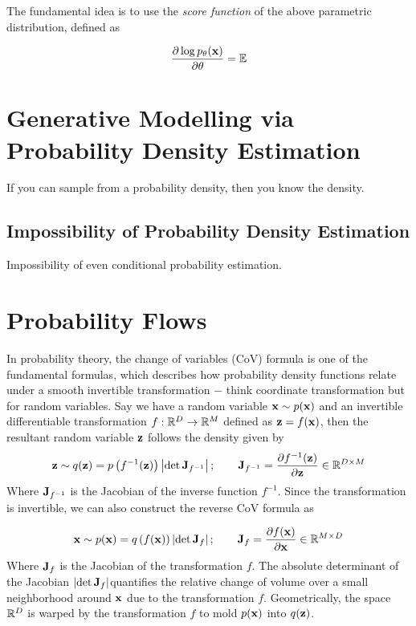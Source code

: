 \documentclass[a4paper, 11pt]{article}
\begin{document}
The fundamental idea is to use the \emph{score function} of the above parametric distribution, defined as 

\begin{align}
    \frac{\partial \log p_\theta(\mbox{$\mbox{$\mathbf{x}$}$})}{\partial \theta} = \mathbb{E} 
\end{align}


\section{Generative Modelling via Probability Density Estimation}

If you can sample from a probability density, then you know the density.

\subsection{Impossibility of Probability Density Estimation}
Impossibility of even conditional probability estimation.

\section{Probability Flows}
In probability theory, the change of variables (CoV) formula is one of the fundamental formulas, which describes how probability density functions relate under a smooth invertible transformation $-$ think coordinate transformation but for random variables. Say we have a random variable $\mbox{$\mbox{$\mathbf{x}$}$} \sim p(\mbox{$\mbox{$\mathbf{x}$}$})$ and an invertible differentiable transformation $f: \mathbb{R}^D \to \mathbb{R}^M$ defined as $\mbox{$\mbox{$\mathbf{z}$}$} = f(\mbox{$\mbox{$\mathbf{x}$}$})$, then the resultant random variable $\mbox{$\mbox{$\mathbf{z}$}$}$ follows the density given by
\begin{align}
    \mbox{$\mbox{$\mathbf{z}$}$} \sim q(\mbox{$\mbox{$\mathbf{z}$}$}) = p\left(f^{-1}(\mbox{$\mbox{$\mathbf{z}$}$}) \right)\left |\det \mbox{$\mbox{$\mathbf{J}$}$}_{f^{-1}} \right|; \qquad \mbox{$\mbox{$\mathbf{J}$}$}_{f^{-1}} = \frac{\partial f^{-1}(\mbox{$\mbox{$\mathbf{z}$}$})}{\partial \mbox{$\mbox{$\mathbf{z}$}$}} \in \mathbb{R}^{D \times M}
\end{align}
Where $\mbox{$\mbox{$\mathbf{J}$}$}_{f^{-1}}$ is the Jacobian of the inverse function $f^{-1}$. Since the transformation is invertible, we can also construct the reverse CoV formula as

\begin{align}
    \mbox{$\mbox{$\mathbf{x}$}$} \sim p(\mbox{$\mbox{$\mathbf{x}$}$}) = q\left(f(\mbox{$\mbox{$\mathbf{x}$}$}) \right)\left |\det \mbox{$\mbox{$\mathbf{J}$}$}_{f} \right|; \qquad \mbox{$\mbox{$\mathbf{J}$}$}_{f} = \frac{\partial f(\mbox{$\mbox{$\mathbf{x}$}$})}{\partial \mbox{$\mbox{$\mathbf{x}$}$}} \in \mathbb{R}^{M \times D}
\end{align}
Where $\mbox{$\mbox{$\mathbf{J}$}$}_{f}$ is the Jacobian of the transformation $f$. The absolute determinant of the Jacobian $\left |\det \mbox{$\mbox{$\mathbf{J}$}$}_{f} \right|$quantifies the relative change of volume over a small neighborhood around $\mbox{$\mbox{$\mathbf{x}$}$}$ due to the transformation $f$. Geometrically, the space $\mathbb{R}^D$ is warped by the transformation $f$ to mold $p(\mbox{$\mbox{$\mathbf{x}$}$})$ into $q(\mbox{$\mbox{$\mathbf{z}$}$})$.
\end{document}
